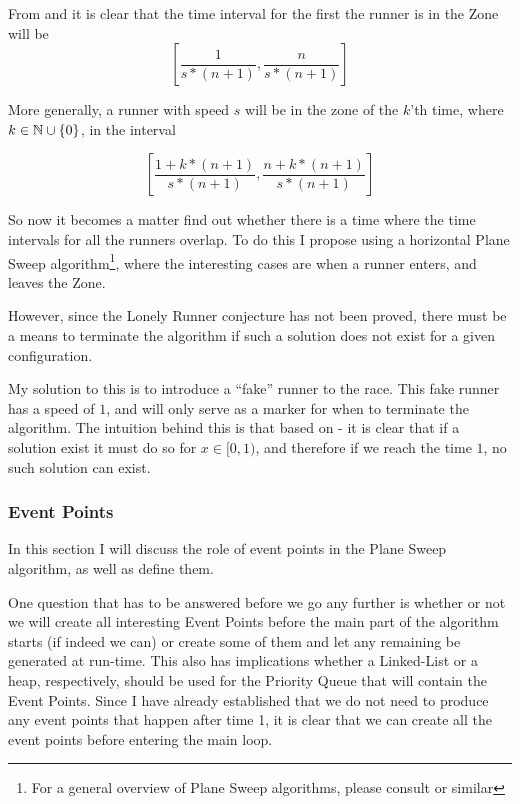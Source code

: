 From  and  it is clear that the time interval for the first the runner is in the Zone will be 
\begin{displaymath}
\left[\frac{1}{s * (n+1)}, \frac{n}{s * (n+1)}\right]
\end{displaymath}

More generally, a runner with speed $s$ will be in the zone of the $k$'th time, where $k \in \mathbb{N} \cup \{0\}$, in the interval 

\begin{displaymath}
\left[\frac{1 + k * (n+1)}{s * (n+1)}, \frac{n + k * (n+1)}{s * (n+1)}\right] 
\end{displaymath}

So now it becomes a matter find out whether there is a time where the time intervals for all the runners overlap. To do this I propose using a horizontal Plane Sweep algorithm\footnote{For a general overview of Plane Sweep algorithms, please consult \cite{citeulike:3347056} or similar}, where the interesting cases are when a runner enters, and leaves the Zone. 

However, since the Lonely Runner conjecture has not been proved, there must be a means to terminate the algorithm if such a solution does not exist for a given configuration.

My solution to this is to introduce a ``fake'' runner to the race. This fake runner has a speed of $1$, and will only serve as a marker for when to terminate the algorithm. The intuition behind this is that based on  - it is clear that if a solution exist it must do so for $x \in [0,1)$, and therefore if we reach the time $1$, no such solution can exist. 

\subsubsection{Event Points}
\label{eventPoints}
In this section I will discuss the role of event points in the Plane Sweep algorithm, as well as define them.

One question that has to be answered before we go any further is whether or not we will create all interesting Event Points before the main part of the algorithm starts (if indeed we can) or create some of them and let any remaining be generated at run-time. This also has implications whether a Linked-List or a heap, respectively, should be used for the Priority Queue that will contain the Event Points. Since I have already established that we do not need to produce any event points that happen after time 1, it is clear that we can create all the event points before entering the main loop.\\ 


